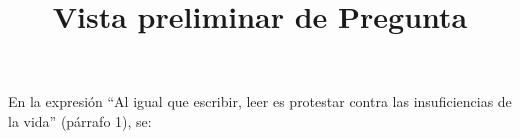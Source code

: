 \documentclass[a4paper,10pt]{article}\usepackage[utf8]{inputenc}\usepackage[spanish]{babel}\usepackage{times}
\title{Vista preliminar de Pregunta}
\begin{document}
\twocolumn 

\maketitle

En la expresión “Al igual que escribir, leer es protestar contra las insuficiencias de la vida” (párrafo 1), se:
\end{document}
